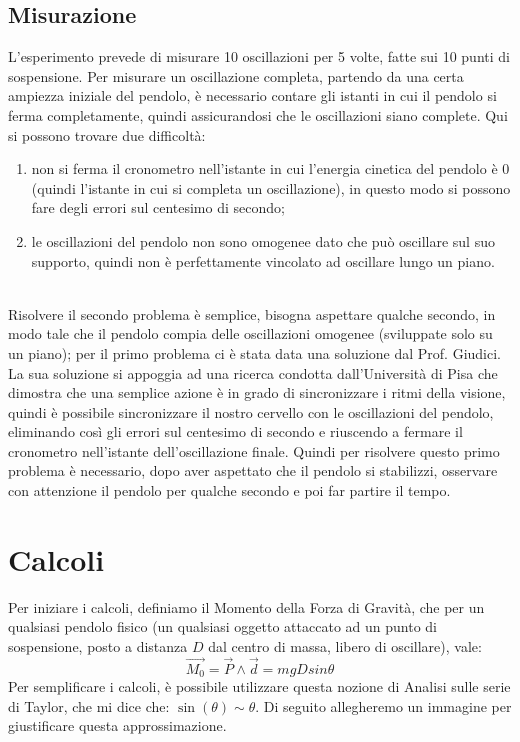\documentclass[a4paper]{article}
\begin{document}
    \subsection{Misurazione}
    L'esperimento prevede di misurare 10 oscillazioni per 5 volte, fatte sui 10 punti di sospensione. Per misurare un oscillazione completa, partendo da una certa ampiezza iniziale del pendolo, è necessario contare gli istanti in cui il pendolo si ferma completamente, quindi assicurandosi che le oscillazioni siano complete.
    Qui si possono trovare due difficoltà:
    \begin{enumerate}
        \item non si ferma il cronometro nell'istante in cui l'energia cinetica del pendolo è 0 (quindi l'istante in cui si completa un oscillazione), in questo modo si possono fare degli errori sul centesimo di secondo;
        \item le oscillazioni del pendolo non sono omogenee dato che può oscillare sul suo supporto, quindi non è perfettamente vincolato ad oscillare lungo un piano.
    \end{enumerate}\\
    
    Risolvere il secondo problema è semplice, bisogna aspettare qualche secondo, in modo tale che il pendolo compia delle oscillazioni omogenee (sviluppate solo su un piano); per il primo problema ci è stata data una soluzione dal Prof. Giudici. La sua soluzione si appoggia ad una ricerca condotta dall'Università di Pisa che dimostra che una semplice azione è in grado di sincronizzare i ritmi della visione, quindi è possibile sincronizzare il nostro cervello con le oscillazioni del pendolo, eliminando così gli errori sul centesimo di secondo e riuscendo a fermare il cronometro nell'istante dell'oscillazione finale. Quindi per risolvere questo primo problema è necessario, dopo aver aspettato che il pendolo si stabilizzi, osservare con attenzione il pendolo per qualche secondo e poi far partire il tempo.
    
    \section{Calcoli}
        Per iniziare i calcoli, definiamo il Momento della Forza di Gravità, che per un qualsiasi pendolo fisico (un qualsiasi oggetto attaccato ad un punto di sospensione, posto a distanza $D$ dal centro di massa, libero di oscillare), vale:
        \begin{equation}\label{eq:1}
            \vec{M_0} = \vec{P} \wedge \vec{d} = m g D sin\theta
        \end{equation}
        Per semplificare i calcoli, è possibile utilizzare questa nozione di Analisi sulle serie di Taylor, che mi dice che: $\sin(\theta) \sim \theta$. Di seguito allegheremo un immagine per giustificare questa approssimazione.
        
\end{document}
